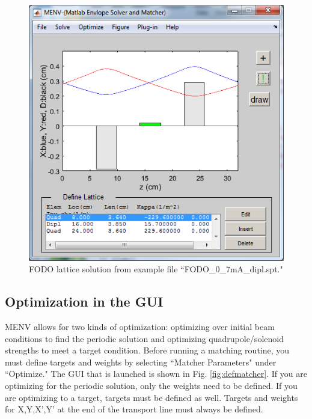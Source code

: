 \documentclass[../menv_main.tex]{subfiles}
\begin{document}
\begin{figure}
\centering
\includegraphics{figures/maingui_fodo.png}
\caption{FODO lattice solution from example file ``FODO\_0\_7mA\_dipl.spt."}
\label{fig:fodo}
\end{figure}

\clearpage
\subsection{Optimization in the GUI}

MENV allows for two kinds of optimization: optimizing over initial beam conditions to find the periodic solution and optimizing quadrupole/solenoid strengths to meet a target condition. Before running a matching routine, you must define targets and weights by selecting ``Matcher Parameters" under ``Optimize." The GUI that is launched is shown in Fig. \ref{fig:defmatcher}. If you are optimizing for the periodic solution, only the weights need to be defined. 
If you are optimizing to a target, targets must be defined as well. Targets and weights for X,Y,X',Y' at the end of the transport line must always be defined. 
\end{document}
